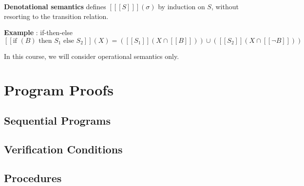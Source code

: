 \documentclass[12pt, a4paper]{book}
\begin{document}
\textbf{Denotational semantics} defines $[[[S]]](\sigma)$ by induction on $S$,
without resorting to the transition relation.

\begin{framed}
    \textbf{Example} : if-then-else
    $$
    [[\textrm{if } (B) \textrm{ then } S_{1} \textrm{ else } S_{2}]](X) =
    ([[S_{1}]] (X \cap [[B]])) \cup ([[S_{2}]] ( X \cap [[\lnot B]] ))
    $$
\end{framed}

In this course, we will consider operational semantics only.



  \chapter{Program Proofs}
  \label{chap:Program Proofs}

  \section{Sequential Programs}
  \label{sec:Sequential Programs}

  \section{Verification Conditions}
  \label{sec:Verification Conditions}
  \section{Procedures}
  \label{sec:Procedures}

\end{document}
